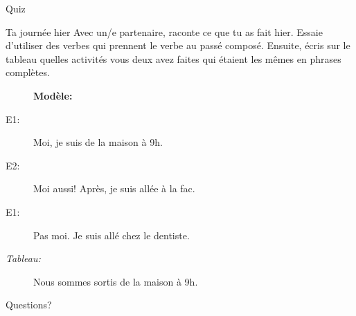 \documentclass{beamer}
\begin{document}
  \begin{frame}{}
    \begin{center}
      \Large Quiz
    \end{center}
  \end{frame}

  \begin{frame}{Ta journée hier}
    Avec un/e partenaire, raconte ce que tu as fait hier.
    Essaie d'utiliser des verbes qui prennent le verbe  au passé composé.
    Ensuite, écris sur le tableau quelles activités vous deux avez faites qui étaient les mêmes en phrases complètes. \\
    \begin{description}
      \item[] \textbf{Modèle:}
      \item[E1:] Moi, je suis de la maison à 9h.
      \item[E2:] Moi aussi! Après, je suis allée à la fac.
      \item[E1:] Pas moi. Je suis allé chez le dentiste.
      \item[\emph{Tableau:}] Nous sommes sortis de la maison à 9h.
    \end{description}
  \end{frame}


  \begin{frame}{}
    \begin{center}
      \Large Questions?
    \end{center}
  \end{frame}
\end{document}
